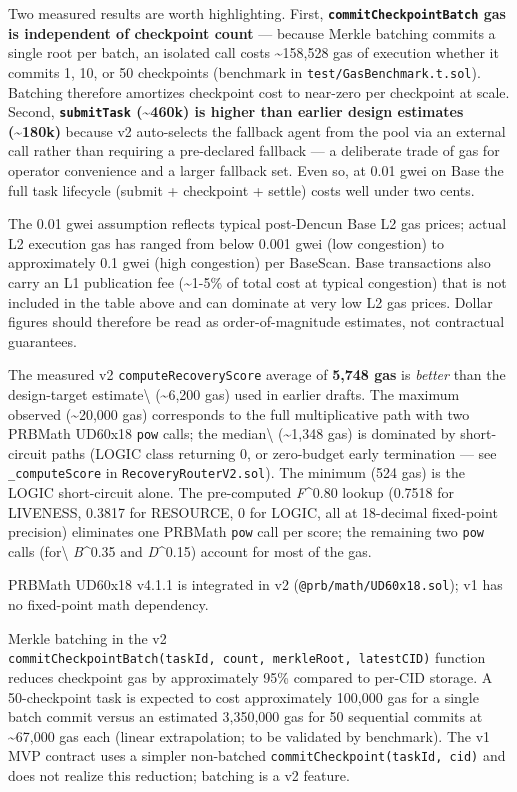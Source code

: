 \documentclass[
  10pt,
]{article}
\begin{document}
Two measured results are worth highlighting. First,
\textbf{\texttt{commitCheckpointBatch} gas is independent of checkpoint
count} --- because Merkle batching commits a single root per batch, an
isolated call costs \textasciitilde158,528 gas of execution whether it
commits 1, 10, or 50 checkpoints (benchmark in
\texttt{test/GasBenchmark.t.sol}). Batching therefore amortizes
checkpoint cost to near-zero per checkpoint at scale. Second,
\textbf{\texttt{submitTask} (\textasciitilde460k) is higher than earlier
design estimates (\textasciitilde180k)} because v2 auto-selects the
fallback agent from the pool via an external call rather than requiring a
pre-declared fallback --- a deliberate trade of gas for operator
convenience and a larger fallback set. Even so, at 0.01 gwei on Base the
full task lifecycle (submit + checkpoint + settle) costs well under two
cents.

The 0.01 gwei assumption reflects typical post-Dencun Base L2 gas
prices; actual L2 execution gas has ranged from below 0.001 gwei (low
congestion) to approximately 0.1 gwei (high congestion) per BaseScan.
Base transactions also carry an L1 publication fee (\textasciitilde1-5\%
of total cost at typical congestion) that is not included in the table
above and can dominate at very low L2 gas prices. Dollar figures should
therefore be read as order-of-magnitude estimates, not contractual
guarantees.

The measured v2 \texttt{computeRecoveryScore} average of \textbf{5,748
gas} is \emph{better} than the design-target estimate\textbackslash{}
(\textasciitilde6,200 gas) used in earlier drafts. The maximum observed
(\textasciitilde20,000 gas) corresponds to the full multiplicative path
with two PRBMath UD60x18 \texttt{pow} calls; the median\textbackslash{}
(\textasciitilde1,348 gas) is dominated by short-circuit paths (LOGIC
class returning 0, or zero-budget early termination --- see
\texttt{\_computeScore} in \texttt{RecoveryRouterV2.sol}). The minimum
(524 gas) is the LOGIC short-circuit alone. The pre-computed
\emph{F}\^{}0.80 lookup (0.7518 for LIVENESS, 0.3817 for RESOURCE, 0 for
LOGIC, all at 18-decimal fixed-point precision) eliminates one PRBMath
\texttt{pow} call per score; the remaining two \texttt{pow} calls
(for\textbackslash{} \emph{B}\^{}0.35 and \emph{D}\^{}0.15) account for
most of the gas.

PRBMath UD60x18 v4.1.1 is integrated in v2
(\texttt{@prb/math/UD60x18.sol}); v1 has no fixed-point math dependency.

Merkle batching in the v2
\texttt{commitCheckpointBatch(taskId,\ count,\ merkleRoot,\ latestCID)}
function reduces checkpoint gas by approximately 95\% compared to
per-CID storage. A 50-checkpoint task is expected to cost approximately
100,000 gas for a single batch commit versus an estimated 3,350,000 gas
for 50 sequential commits at \textasciitilde67,000 gas each (linear
extrapolation; to be validated by benchmark). The v1 MVP contract uses a
simpler non-batched \texttt{commitCheckpoint(taskId,\ cid)} and does not
realize this reduction; batching is a v2 feature.
\end{document}
